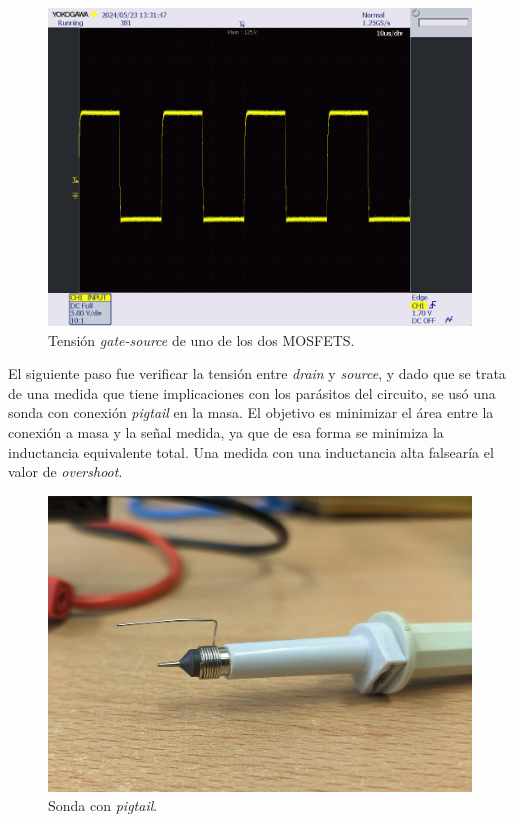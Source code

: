 \begin{figure}[H]
	\centering
	\includegraphics[width=0.7\linewidth]{fig/VGS}
	\caption{Tensión \textit{gate-source} de uno de los dos MOSFETS.}
\end{figure}


El siguiente paso fue verificar la tensión entre \textit{drain} y \textit{source}, y dado que se trata de una medida que tiene implicaciones con los parásitos del circuito, se usó una sonda con conexión \textit{pigtail} en la masa. El objetivo es minimizar el área entre la conexión a masa y la señal medida, ya que de esa forma se minimiza la inductancia equivalente total. Una medida con una inductancia alta falsearía el valor de \textit{overshoot}.


\begin{figure}[H]
	\centering
	\includegraphics[width=0.7\linewidth]{fig/pigtail1}
	\caption{Sonda con \textit{pigtail}.}
\end{figure}

